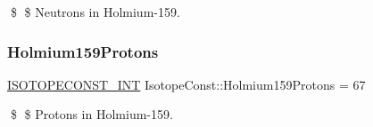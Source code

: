 \$ \$ Neutrons in Holmium-\/159. \mbox{\label{group___isotope_const-_holmium-_ho159_ga78b1080c75e817ade01e2c6f60076ad3}} 
\subsubsection{\texorpdfstring{Holmium159\+Protons}{Holmium159Protons}}
{\footnotesize\ttfamily \mbox{\hyperlink{group___isotope_const-_macros_ga5f18360b3e99483a35c32d789e62621c}{I\+S\+O\+T\+O\+P\+E\+C\+O\+N\+S\+T\+\_\+\+I\+NT}} Isotope\+Const\+::\+Holmium159\+Protons = 67}

\$ \$ Protons in Holmium-\/159. 